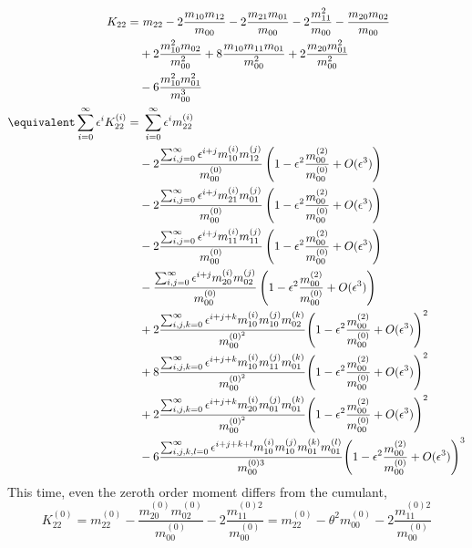 \begin{align*}
  K_{22} = &\ m_{22}
   - 2 \frac{m_{10}m_{12}}{m_{00}} - 2\frac{m_{21}m_{01}}{m_{00}}
    - 2 \frac{m_{11}^2}{m_{00}} - \frac{m_{20}m_{02}}{m_{00}}
    \\
   &  + 2 \frac{m_{10}^2 m_{02}}{m_{00}^2} + 8 \frac{m_{10}m_{11}m_{01}}{m_{00}^2}
    + 2 \frac{m_{20}m_{01}^2}{m_{00}^2}
    \\
   &  - 6 \frac{m_{10}^2 m_{01}^2}{m_{00}^3}
  \\\equivalent
  \sum_{i=0}^\infty \epsilon^i K_{22}^{(i)}
  = &\ \sum_{i=0}^\infty \epsilon^i m_{22}^{(i)}
  \\&
  - 2 \frac{ \sum_{i,j=0}^\infty \epsilon^{i+j} m_{10}^{(i)} m_{12}^{(j)} }{m_{00}^{(0)}}
   \left(1 - \epsilon^2 \frac{m_{00}^{(2)}}{m_{00}^{(0)}}  + O(\epsilon^3)\right)
  \\&
  - 2 \frac{ \sum_{i,j=0}^\infty \epsilon^{i+j} m_{21}^{(i)} m_{01}^{(j)} }{m_{00}^{(0)}}
   \left(1 - \epsilon^2 \frac{m_{00}^{(2)}}{m_{00}^{(0)}}  + O(\epsilon^3)\right)
  \\&
  - 2 \frac{ \sum_{i,j=0}^\infty \epsilon^{i+j} m_{11}^{(i)} m_{11}^{(j)} }{m_{00}^{(0)}}
   \left(1 - \epsilon^2 \frac{m_{00}^{(2)}}{m_{00}^{(0)}}  + O(\epsilon^3)\right)
  \\&
  -   \frac{ \sum_{i,j=0}^\infty \epsilon^{i+j} m_{20}^{(i)} m_{02}^{(j)} }{m_{00}^{(0)}}
   \left(1 - \epsilon^2 \frac{m_{00}^{(2)}}{m_{00}^{(0)}}  + O(\epsilon^3)\right)
  \\&
  + 2 \frac{ \sum_{i,j,k=0}^\infty \epsilon^{i+j+k} m_{10}^{(i)}m_{10}^{(j)}m_{02}^{(k)} }
  {m_{00}^{{(0)}^2}}
   {\left(1 - \epsilon^2 \frac{m_{00}^{(2)}}{m_{00}^{(0)}}  + O(\epsilon^3)\right)}^2
  \\&
  + 8 \frac{ \sum_{i,j,k=0}^\infty \epsilon^{i+j+k} m_{10}^{(i)}m_{11}^{(j)}m_{01}^{(k)} }
  {m_{00}^{{(0)}^2}}
   {\left(1 - \epsilon^2 \frac{m_{00}^{(2)}}{m_{00}^{(0)}}  + O(\epsilon^3)\right)}^2
  \\&
  + 2 \frac{ \sum_{i,j,k=0}^\infty \epsilon^{i+j+k} m_{20}^{(i)}m_{01}^{(j)}m_{01}^{(k)} }
  {m_{00}^{{(0)}^2}}
   {\left(1 - \epsilon^2 \frac{m_{00}^{(2)}}{m_{00}^{(0)}}  + O(\epsilon^3)\right)}^2
  \\&
  - 6 \frac{ \sum_{i,j,k,l=0}^\infty \epsilon^{i+j+k+l} m_{10}^{(i)}m_{10}^{(j)}m_{01}^{(k)}m_{01}^{(l)}}{m_{00}^{(0)3}}
   {\left(1 - \epsilon^2 \frac{m_{00}^{(2)}}{m_{00}^{(0)}}  + O(\epsilon^3)\right)}^3
\end{align*}
This time, even the zeroth order moment differs from the cumulant,
\begin{equation}
  K_{22}^{(0)}
  = m_{22}^{(0)} - \frac{ m_{20}^{(0)} m_{02}^{(0)} }{m_{00}^{(0)}} - 2\frac{ m_{11}^{(0)2}  }{m_{00}^{(0)}} = m_{22}^{(0)} - \theta^2 m_{00}^{(0)} - 2\frac{ m_{11}^{(0)2}  }{m_{00}^{(0)}}
 \end{equation}
